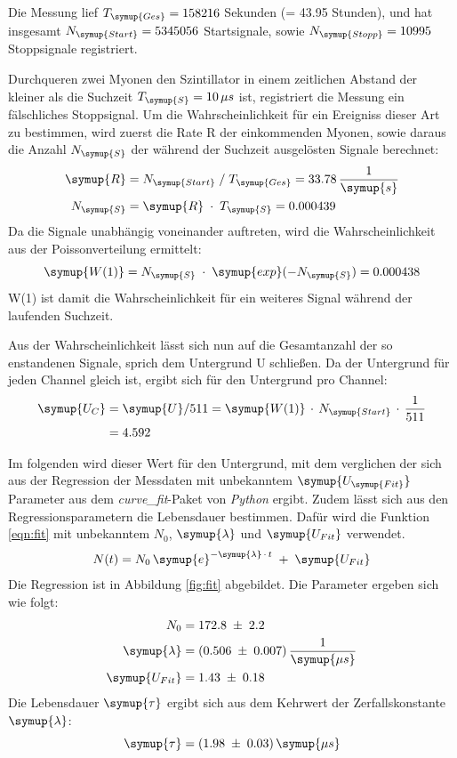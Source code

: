 Die Messung lief $T_{\symup{Ges}}=158216$ Sekunden (= 43.95 Stunden), und hat insgesamt
$N_{\symup{Start}}=5345056$ Startsignale, sowie $N_{\symup{Stopp}}=10995$ Stoppsignale registriert.

\noindent
Durchqueren zwei Myonen den Szintillator in einem zeitlichen Abstand der kleiner als die
Suchzeit $T_{\symup{S}}=10\,\mu s$ ist, registriert die Messung ein fälschliches Stoppsignal.
Um die Wahrscheinlichkeit für ein Ereigniss dieser Art zu bestimmen, wird zuerst die Rate R
der einkommenden Myonen, sowie daraus die Anzahl $N_{\symup{S}}$ der während der Suchzeit ausgelösten Signale
berechnet:
\begin{align*}
  \symup{R} &= N_{\symup{Start}}\;/\;T_{\symup{Ges}} = 33.78\,\frac{1}{\symup{s}}\\
  N_{\symup{S}} &= \symup{R}\;\cdot\;T_{\symup{S}} = 0.000439\\
\end{align*}
Da die Signale unabhängig voneinander auftreten, wird die Wahrscheinlichkeit aus der
Poissonverteilung ermittelt:
\begin{equation*}
  \symup{W(1)} = N_{\symup{S}}\;\cdot\;\symup{exp}(-N_{\symup{S}}) = 0.000438\\
\end{equation*}
W(1) ist damit die Wahrscheinlichkeit für ein weiteres Signal während der laufenden Suchzeit.

Aus der Wahrscheinlichkeit lässt sich nun auf die Gesamtanzahl der so enstandenen
Signale, sprich dem Untergrund U schließen. Da der Untergrund für jeden Channel gleich ist,
ergibt sich für den Untergrund pro Channel:
\begin{align*}
  \symup{U_{C}} &= \symup{U}/511 = \symup{W(1)}\,\cdot\,N_{\symup{Start}}\,\cdot\,\frac{1}{511}\\
                &= 4.592
\end{align*}

Im folgenden wird dieser Wert für den Untergrund, mit dem verglichen der sich aus der Regression
der Messdaten mit unbekanntem $\symup{U_{\symup{Fit}}}$ Parameter aus dem \textit{curve\_fit}-Paket von \textit{Python} ergibt. Zudem lässt sich aus den Regressionsparametern die Lebensdauer bestimmen.
Dafür wird die Funktion \ref{eqn:fit} mit unbekanntem $N_{0}$, $\symup{\lambda}$ und $\symup{U_{Fit}}$ verwendet.
\begin{equation}
  N(t) = N_0\, \symup{e}^{-\symup{\lambda}\,\cdot\,t}\;+\;\symup{U_{Fit}}
  \label{eqn:fit}
\end{equation}
Die Regression ist in Abbildung \ref{fig:fit} abgebildet. Die Parameter ergeben sich wie folgt:
\begin{align*}
  N_0 &= 172.8\;\pm\;2.2\\
  \symup{\lambda} &= (0.506\;\pm\;0.007)\,\frac{1}{\symup{\mu s}}\\
  \symup{U_{Fit}} &= 1.43\;\pm\;0.18
\end{align*}
Die Lebensdauer $\symup{\tau}$ ergibt sich aus dem Kehrwert der Zerfallskonstante $\symup{\lambda}$:
\begin{equation*}
  \symup{\tau} = (1.98\;\pm\;0.03)\,\symup{\mu s}
\end{equation*}

